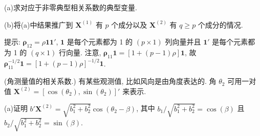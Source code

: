 \noindent (a)\quad 求对应于非零典型相关系数的典型变量.

\noindent (b)\quad 将(a)中结果推广到 $\mathbf{X}^{(1)}$ 有 $p$ 个成分以及 $\mathbf{X}^{(2)}$ 有 $q\ge p$ 个成分的情况.

提示: $\boldsymbol{\rho}_{12}=\rho\mathbf{1}\mathbf{1}'$, $\mathbf{1}$ 是每个元素都为 1 的 $(p\times1)$ 列向量并且 $\mathbf{1}'$ 是每个元素都为 1 的 $(q\times1)$ 行向量. 注意, $\boldsymbol{\rho}_{11}\mathbf{1}=[1+(p-1)\rho]\mathbf{1}$, 故 $\boldsymbol{\rho}_{11}^{-1/2}\mathbf{1}=[1+(p-1)\rho]^{-1/2}\mathbf{1}$.

\quad (角测量值的相关系数.) 有某些观测值, 比如风向是由角度表达的. 角 $\theta_2$ 可用一对值 $\mathbf{X}^{(2)}=[\cos(\theta_2),\sin(\theta_2)]'$ 来表示.

\noindent (a)\quad 证明 $b'\mathbf{X}^{(2)}=\sqrt{b_1^2+b_2^2}\cos(\theta_2-\beta)$, 其中 $b_1/\sqrt{b_1^2+b_2^2}=\cos(\beta)$ 且 $b_2/\sqrt{b_1^2+b_2^2}=\sin(\beta)$.
